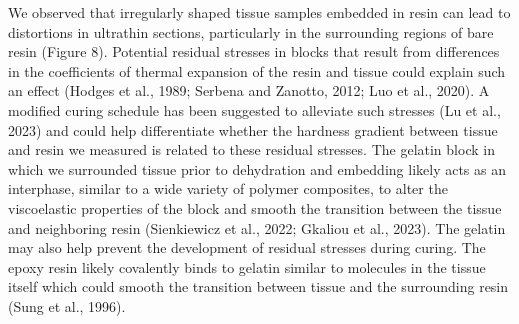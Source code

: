 \documentclass{article}
\begin{document}
We observed that irregularly shaped tissue samples embedded in resin can lead to distortions in ultrathin sections, particularly in the surrounding regions of bare resin (Figure 8). Potential residual stresses in blocks that result from differences in the coefficients of thermal expansion of the resin and tissue could explain such an effect (Hodges et al., 1989; Serbena and Zanotto, 2012; Luo et al., 2020). A modified curing schedule has been suggested to alleviate such stresses (Lu et al., 2023) and could help differentiate whether the hardness gradient between tissue and resin we measured is related to these residual stresses. The gelatin block in which we surrounded tissue prior to dehydration and embedding likely acts as an interphase, similar to a wide variety of polymer composites, to alter the viscoelastic properties of the block and smooth the transition between the tissue and neighboring resin (Sienkiewicz et al., 2022; Gkaliou et al., 2023). The gelatin may also help prevent the development of residual stresses during curing. The epoxy resin likely covalently binds to gelatin similar to molecules in the tissue itself which could smooth the transition between tissue and the surrounding resin (Sung et al., 1996).
\end{document}
